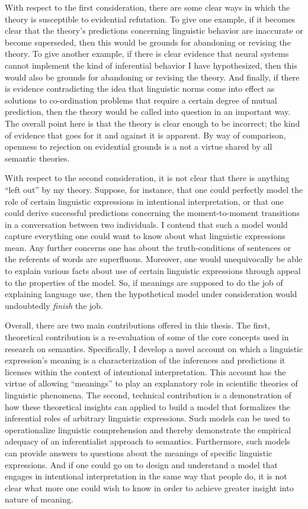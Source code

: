 With respect to the first consideration, there are some clear ways in which the theory is susceptible to evidential refutation. To give one example, if it becomes clear that the theory's predictions concerning linguistic behavior are inaccurate or become superseded, then this would be grounds for abandoning or revising the theory. To give another example, if there is clear evidence that neural systems cannot implement the kind of inferential behavior I have hypothesized, then this would also be grounds for abandoning or revising the theory. And finally, if there is evidence contradicting the idea that linguistic norms come into effect as solutions to co-ordination problems that require a certain degree of mutual prediction, then the theory would be called into question in an important way. The overall point here is that the theory is clear enough to be incorrect; the kind of evidence that goes for it and against it is apparent. By way of comparison, openness to rejection on evidential grounds is a not a virtue shared by all semantic theories.

With respect to the second consideration, it is not clear that there is anything ``left out'' by my theory. Suppose, for instance, that one could perfectly model the role of certain linguistic expressions in intentional interpretation, or that one could derive successful predictions concerning the moment-to-moment transitions in a conversation between two individuals. I contend that such a model would capture everything one could want to know about what linguistic expressions mean. Any further concerns one has about the truth-conditions of sentences or the referents of words are superfluous. Moreover, one would unequivocally be able to explain various facts about use of certain linguistic expressions through appeal to the properties of the model. So, if meanings are supposed to do the job of explaining language use, then the hypothetical model under consideration would undoubtedly \textit{finish} the job.

Overall, there are two main contributions offered in this thesis. The first, theoretical contribution is a re-evaluation of some of the core concepts used in research on semantics. Specifically, I develop a novel account on which a linguistic expression's meaning is a characterization of the inferences and predictions it licenses within the context of intentional interpretation. This account has the virtue of allowing ``meanings'' to play an explanatory role in scientific theories of linguistic phenomena. The second, technical contribution is a demonstration of how these theoretical insights can applied to build a model that formalizes the inferential roles of arbitrary linguistic expressions. Such models can be used to operationalize linguistic comprehension and thereby demonstrate the empirical adequacy of an inferentialist approach to semantics. Furthermore, such models can provide answers to questions about the meanings of specific linguistic expressions. And if one could go on to design and understand a model that engages in intentional interpretation in the same way that people do, it is not clear what more one could wish to know in order to achieve greater insight into nature of meaning.